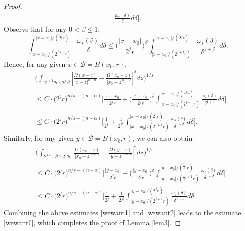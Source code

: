 \documentclass[preprint,10pt]{elsarticle}
\numberwithin{equation}{section}
\begin{document}
\begin{proof}
\begin{equation*}
\begin{split}
\frac{\omega_s(\delta)}{\delta}d\delta\bigg].
\end{split}
\end{equation*}
Observe that for any $0<\beta\leq1$,
\begin{equation*}
\int_{|x-x_0|/{(2^{j+1}r)}}^{|x-x_0|/{(2^jr)}}\frac{\omega_s(\delta)}{\delta}d\delta
\leq\Big(\frac{|x-x_0|}{2^{j}r}\Big)^{\beta}
\int_{|x-x_0|/{(2^{j+1}r)}}^{|x-x_0|/{(2^jr)}}\frac{\omega_s(\delta)}{\delta^{1+\beta}}d\delta.
\end{equation*}
Hence, for any given $x\in \mathcal{B}=B(x_0,r)$,
\begin{equation}\label{wewant1}
\begin{split}
&\bigg(\int_{2^{j+1}\mathcal{B}\backslash2^j\mathcal{B}}
\left|\frac{\Omega(x-z)}{|x-z|^{n-\alpha}}-\frac{\Omega(x_0-z)}{|x_0-z|^{n-\alpha}}\right|^sdz\bigg)^{1/s}\\
&\leq C\cdot\big(2^jr\big)^{n/s-(n-\alpha)}\bigg[\frac{|x-x_0|}{2^jr}+\Big(\frac{|x-x_0|}{2^{j}r}\Big)^{\beta}
\int_{|x-x_0|/{(2^{j+1}r)}}^{|x-x_0|/{(2^jr)}}\frac{\omega_s(\delta)}{\delta^{1+\beta}}d\delta\bigg]\\
&\leq C\cdot\big(2^jr\big)^{n/s-(n-\alpha)}\bigg[\frac{1}{2^j}+\frac{1}{2^{j\beta}}
\int_{|x-x_0|/{(2^{j+1}r)}}^{|x-x_0|/{(2^jr)}}\frac{\omega_s(\delta)}{\delta^{1+\beta}}d\delta\bigg].
\end{split}
\end{equation}
Similarly, for any given $y\in \mathcal{B}=B(x_0,r)$, we can also obtain
\begin{equation}\label{wewant2}
\begin{split}
&\bigg(\int_{2^{j+1}\mathcal{B}\backslash 2^j\mathcal{B}}
\left|\frac{\Omega(x_0-z)}{|x_0-z|^{n-\alpha}}-\frac{\Omega(y-z)}{|y-z|^{n-\alpha}}\right|^sdz\bigg)^{1/s}\\
&\leq C\cdot\big(2^jr\big)^{n/s-(n-\alpha)}
\bigg[\frac{|y-x_0|}{2^jr}+\Big(\frac{|y-x_0|}{2^{j}r}\Big)^{\beta}
\int_{|y-x_0|/{(2^{j+1}r)}}^{|y-x_0|/{(2^jr)}}\frac{\omega_s(\delta)}{\delta^{1+\beta}}d\delta\bigg]\\
&\leq C\cdot\big(2^jr\big)^{n/s-(n-\alpha)}
\bigg[\frac{1}{2^j}+\frac{1}{2^{j\beta}}
\int_{|y-x_0|/{(2^{j+1}r)}}^{|y-x_0|/{(2^jr)}}\frac{\omega_s(\delta)}{\delta^{1+\beta}}d\delta\bigg].
\end{split}
\end{equation}
Combining the above estimates \eqref{wewant1} and \eqref{wewant2} leads to the estimate \eqref{wewant0}, which completes the proof of Lemma \ref{lem3}.
\end{proof}
\end{document}

